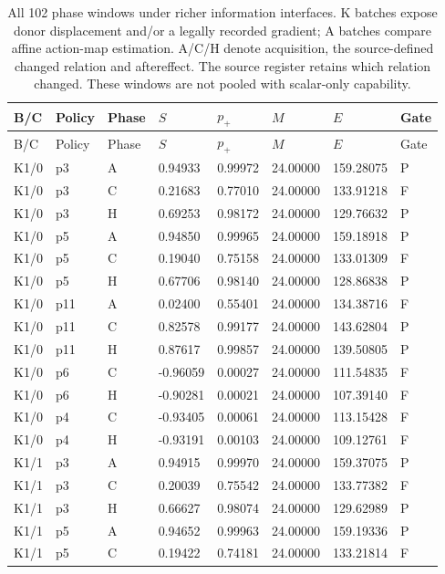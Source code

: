 \begin{longtable}{llllllll}
\caption{All 102 phase windows under richer information interfaces. K batches expose donor displacement and/or a legally recorded gradient; A batches compare affine action-map estimation. A/C/H denote acquisition, the source-defined changed relation and aftereffect. The source register retains which relation changed. These windows are not pooled with scalar-only capability.}\label{tab:rich-action-phases}\\
\toprule
B/C & Policy & Phase & $S$ & $p_+$ & $M$ & $E$ & Gate \\
\midrule
\endfirsthead
\toprule
B/C & Policy & Phase & $S$ & $p_+$ & $M$ & $E$ & Gate \\
\midrule
\endhead
K1/0 & p3 & A & 0.94933 & 0.99972 & 24.00000 & 159.28075 & P \\
K1/0 & p3 & C & 0.21683 & 0.77010 & 24.00000 & 133.91218 & F \\
K1/0 & p3 & H & 0.69253 & 0.98172 & 24.00000 & 129.76632 & P \\
K1/0 & p5 & A & 0.94850 & 0.99965 & 24.00000 & 159.18918 & P \\
K1/0 & p5 & C & 0.19040 & 0.75158 & 24.00000 & 133.01309 & F \\
K1/0 & p5 & H & 0.67706 & 0.98140 & 24.00000 & 128.86838 & P \\
K1/0 & p11 & A & 0.02400 & 0.55401 & 24.00000 & 134.38716 & F \\
K1/0 & p11 & C & 0.82578 & 0.99177 & 24.00000 & 143.62804 & P \\
K1/0 & p11 & H & 0.87617 & 0.99857 & 24.00000 & 139.50805 & P \\
K1/0 & p6 & C & -0.96059 & 0.00027 & 24.00000 & 111.54835 & F \\
K1/0 & p6 & H & -0.90281 & 0.00021 & 24.00000 & 107.39140 & F \\
K1/0 & p4 & C & -0.93405 & 0.00061 & 24.00000 & 113.15428 & F \\
K1/0 & p4 & H & -0.93191 & 0.00103 & 24.00000 & 109.12761 & F \\
K1/1 & p3 & A & 0.94915 & 0.99970 & 24.00000 & 159.37075 & P \\
K1/1 & p3 & C & 0.20039 & 0.75542 & 24.00000 & 133.77382 & F \\
K1/1 & p3 & H & 0.66627 & 0.98074 & 24.00000 & 129.62989 & P \\
K1/1 & p5 & A & 0.94652 & 0.99963 & 24.00000 & 159.19336 & P \\
K1/1 & p5 & C & 0.19422 & 0.74181 & 24.00000 & 133.21814 & F \\

\end{longtable}
